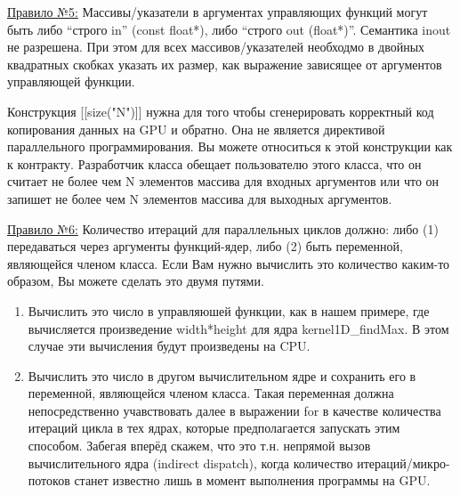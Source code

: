 \documentclass[11pt,fleqn,english,russian]{report} %
\begin{document}
\underline{Правило №5:} Массивы/указатели в аргументах управляющих функций могут быть либо ``строго in'' (const float*), либо ``строго out (float*)''. Семантика inout не разрешена. При этом для всех массивов/указателей необходмо в двойных квадратных скобках указать их размер, как выражение зависящее от аргументов управляющей функции.  

\begin{remark}
Конструкция [[size("N")]] нужна для того чтобы сгенерировать корректный код копирования данных на GPU и обратно. Она не является директивой параллельного программирования. Вы можете относиться к этой конструкции как к контракту. Разработчик класса обещает пользователю этого класса, что он считает не более чем N элементов массива для входных аргументов или что он запишет не более чем N элементов массива для выходных аргументов. 
\end{remark}	

\underline{Правило №6:} Количество итераций для параллельных циклов должно: либо (1) передаваться через аргументы функций-ядер, либо (2) быть переменной, являющейся членом класса. Если Вам нужно вычислить это количество каким-то образом, Вы можете сделать это двумя путями.
\begin{enumerate}
\item Вычислить это число в управляюшей функции, как в нашем примере, где вычисляется произведение width*height для ядра kernel1D\_findMax. В этом случае эти вычисления будут произведены на CPU.
\item Вычислить это число в другом вычислительном ядре и сохранить его в переменной, являющейся членом класса. Такая переменная должна непосредственно учавствовать далее в выражении for в качестве количества итераций цикла в тех ядрах, которые предполагается запускать этим способом. Забегая вперёд скажем, что это т.н. непрямой вызов вычислительного ядра (indirect dispatch), когда количество итераций/микро-потоков станет известно лишь в момент выполнения программы на GPU. 
\end{enumerate}
\end{document}
